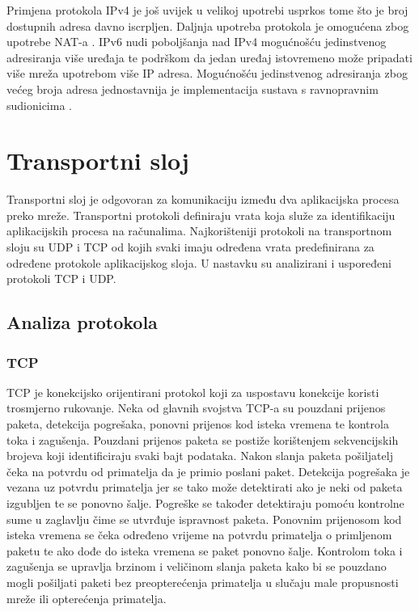 \documentclass[times, utf8, diplomski]{fer}
\begin{document}
Primjena protokola IPv4 je još uvijek u velikoj upotrebi usprkos tome što je broj dostupnih adresa davno iscrpljen. Daljnja upotreba protokola je omogućena zbog upotrebe NAT-a . IPv6 nudi poboljšanja nad IPv4 mogućnošću jedinstvenog adresiranja više uređaja te podrškom da jedan uređaj istovremeno može pripadati više mreža upotrebom više IP adresa. Mogućnošću jedinstvenog adresiranja zbog većeg broja adresa jednostavnija je implementacija sustava s ravnopravnim sudionicima .

\section{Transportni sloj}
Transportni sloj je odgovoran za komunikaciju između dva aplikacijska procesa preko mreže. Transportni protokoli definiraju vrata  koja služe za identifikaciju aplikacijskih procesa na računalima. Najkorišteniji protokoli na transportnom sloju su UDP  i TCP  od kojih svaki imaju određena vrata predefinirana za određene protokole aplikacijskog sloja. U nastavku su analizirani i uspoređeni protokoli TCP i UDP.

\subsection{Analiza protokola}
\subsubsection{TCP}
TCP je konekcijsko orijentirani protokol koji za uspostavu konekcije koristi trosmjerno rukovanje. Neka od glavnih svojstva TCP-a su pouzdani prijenos paketa, detekcija pogrešaka, ponovni prijenos kod isteka vremena te kontrola toka i zagušenja. Pouzdani prijenos paketa se postiže korištenjem sekvencijskih brojeva koji identificiraju svaki bajt podataka. Nakon slanja paketa pošiljatelj čeka na potvrdu od primatelja da je primio poslani paket. Detekcija pogrešaka je vezana uz potvrdu primatelja jer se tako može detektirati ako je neki od paketa izgubljen te se ponovno šalje. Pogreške se također detektiraju pomoću kontrolne sume u zaglavlju čime se utvrđuje ispravnost paketa. Ponovnim prijenosom kod isteka vremena se čeka određeno vrijeme na potvrdu primatelja o primljenom paketu te ako dođe do isteka vremena se paket ponovno šalje. Kontrolom toka i zagušenja se upravlja brzinom i veličinom slanja paketa kako bi se pouzdano mogli pošiljati paketi bez preopterećenja primatelja u slučaju male propusnosti mreže ili opterećenja primatelja.
\end{document}
